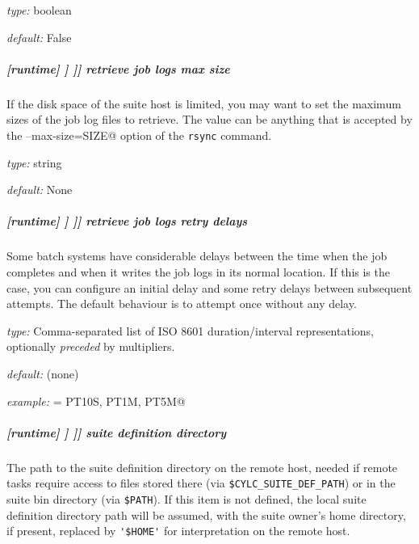 \begin{myitemize}
\item {\em type:} boolean
\item {\em default:} False
\end{myitemize}

\subparagraph[retrieve job logs max size]{[runtime] \textrightarrow [[\_\_NAME\_\_]] \textrightarrow [[[remote]]] \textrightarrow retrieve job logs max size}
\label{runtime-remote-retrieve-job-logs-max-size}

If the disk space of the suite host is limited, you may want to set the maximum
sizes of the job log files to retrieve. The value can be anything that is
accepted by the \lstinline@--max-size=SIZE@ option of the \lstinline=rsync=
command.

\begin{myitemize}
\item {\em type:} string
\item {\em default:} None
\end{myitemize}

\subparagraph[retrieve job logs retry delays]{[runtime] \textrightarrow [[\_\_NAME\_\_]] \textrightarrow [[[remote]]] \textrightarrow retrieve job logs retry delays}
\label{runtime-remote-retrieve-job-logs-retry-delays}

Some batch systems have considerable delays between the time when the job
completes and when it writes the job logs in its normal location. If this is
the case, you can configure an initial delay and some retry delays between
subsequent attempts. The default behaviour is to attempt once without any
delay.

\begin{myitemize}
    \item {\em type:} Comma-separated list of ISO 8601 duration/interval representations, optionally {\em preceded} by multipliers.
    \item {\em default:} (none)
    \item {\em example:} \lstinline@handler = PT10S, PT1M, PT5M@
\end{myitemize}

\subparagraph[suite definition directory]{[runtime] \textrightarrow [[\_\_NAME\_\_]] \textrightarrow [[[remote]]] \textrightarrow  suite definition directory}

The path to the suite definition directory on the remote host, needed if
remote tasks require access to files stored there (via
\lstinline=$CYLC_SUITE_DEF_PATH=) or in the suite bin directory (via
\lstinline=$PATH=).  If this item is not defined, the local suite
definition directory path will be assumed, with the suite owner's home
directory, if present, replaced by \lstinline='$HOME'= for
interpretation on the remote host.

